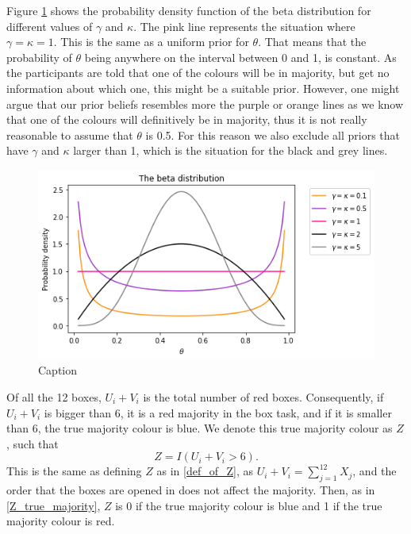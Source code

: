 Figure \ref{fig:pdf_beta_distr} shows the probability density function of the beta distribution for different values of $\gamma$ and $\kappa$. The pink line represents the situation where $\gamma=\kappa=1$. This is the same as a uniform prior for $\theta$. That means that the probability of $\theta$ being anywhere on the interval between 0 and 1, is constant. As the participants are told that one of the colours will be in majority, but get no information about which one, this might be a suitable prior.
However, one might argue that our prior beliefs resembles more the purple or orange lines as we know that one of the colours will definitively be in majority, thus it is not really reasonable to assume that $\theta$ is 0.5. For this reason we also exclude all priors that have $\gamma$ and $\kappa$ larger than 1, which is the situation for the black and grey lines. 

\begin{figure}
    \centering
    \includegraphics[scale=0.5]{pictures/beta_pdf.png}
    \caption{Caption}
    \label{fig:pdf_beta_distr}
\end{figure}


Of all the 12 boxes, $U_i+V_i$ is the total number of red boxes.
Consequently, if $U_i+V_i$ is bigger than 6, it is a red majority in the box task, and if it is smaller than 6, the true majority colour is blue. We denote this true majority colour as $Z$, such that
\begin{equation}
\label{def_of_Z_2}
    Z = I(U_i+V_i>6).
\end{equation}
This is the same as defining $Z$ as in \eqref{def_of_Z}, as $U_i+V_i = \sum_{j=1}^{12}X_j$, and the order that the boxes are opened in does not affect the majority. Then, as in \eqref{Z_true_majority}, $Z$ is 0 if the true majority colour is blue and 1 if the true majority colour is red. 


